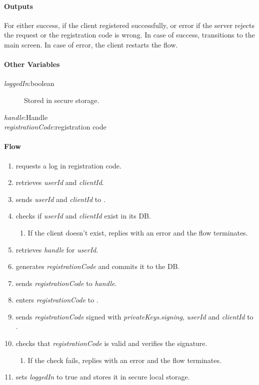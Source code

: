 \documentclass[a4paper,10pt,draft]{article}
\newcommand{\handle}{\emph{handle}}
\newcommand{\registrationCode}{\emph{registrationCode}}
\newcommand{\privateKeys}{\emph{privateKeys}}
\newcommand{\signingKey}{\privateKeys{}.\emph{signing}}
\newcommand{\userId}{\emph{userId}}
\newcommand{\clientId}{\emph{clientId}}
\newcommand{\loggedIn}{\emph{loggedIn}}
\begin{document}
\paragraph{Outputs}
For \Client{} either success, if the client registered successfully, or error if the server rejects the request or the registration code is wrong. In case of success, \Client{} 
transitions to the main screen. In case of error, the client restarts the flow.

\paragraph{Other Variables}
\SpecialItem
\begin{description}
 \item[\loggedIn{}:boolean] Stored in secure storage.
 \item[\handle{}:Handle]
 \item[\registrationCode{}:registration code]
\end{description}

\paragraph{Flow}

\begin{enumerate}
 \item \User{} requests a log in registration code.
 \item \Client{} retrieves \userId{} and \clientId{}.
 \item \Client{} sends \userId{} and \clientId{} to \Server{}.
 \item \Server{} checks if \userId{} and \clientId{} exist in its DB.
 \begin{enumerate}
  \item If the client doesn't exist, \Server{} replies with an error and the flow terminates.
 \end{enumerate}
 \item \Server{} retrieves \handle{} for \userId{}.
 \item \Server{} generates \registrationCode{} and commits it to the DB.
 \item \Server{} sends \registrationCode{} to \handle{}.
 \item \User{} enters \registrationCode{} to \Client{}.
 \item\label{log_out_client_flow:one} \Client{} sends \registrationCode{} signed with \signingKey{}, \userId{} and \clientId{} to \Server{}.
 \item \Server{} checks that \registrationCode{} is valid and verifies the signature.
 \begin{enumerate}
  \item If the check fails, \Server{} replies with an error and the flow terminates.
 \end{enumerate}
 \item \Client{} sets \loggedIn{} to true and stores it in secure local storage.
\end{enumerate}
\end{document}
